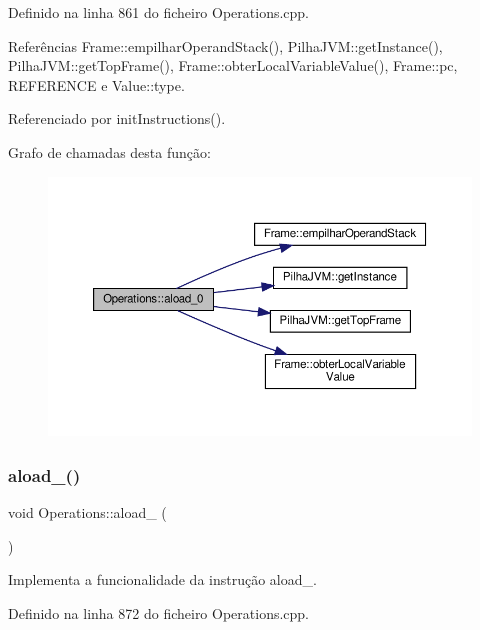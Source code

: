 Definido na linha 861 do ficheiro Operations.\+cpp.



Referências Frame\+::empilhar\+Operand\+Stack(), Pilha\+J\+V\+M\+::get\+Instance(), Pilha\+J\+V\+M\+::get\+Top\+Frame(), Frame\+::obter\+Local\+Variable\+Value(), Frame\+::pc, R\+E\+F\+E\+R\+E\+N\+CE e Value\+::type.



Referenciado por init\+Instructions().

Grafo de chamadas desta função\+:
\nopagebreak
\begin{figure}[H]
\begin{center}
\leavevmode
\includegraphics[width=350pt]{classOperations_a9d821a16ef0681755717e8c4f740f6d0_cgraph}
\end{center}
\end{figure}
\mbox{\label{classOperations_a8291f2b716c1be7428d9b63a5225b52d}} 
\subsubsection{\texorpdfstring{aload\+\_()}{aload\_1()}}
{\footnotesize\ttfamily void Operations\+::aload\+\_ (\begin{DoxyParamCaption}{ }\end{DoxyParamCaption})\hspace{0.3cm}{\ttfamily [private]}}



Implementa a funcionalidade da instrução aload\+\_. 



Definido na linha 872 do ficheiro Operations.\+cpp.



